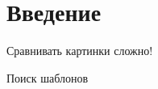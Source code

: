 \section{Введение}

\begin{frame}{Сравнивать картинки сложно!}
    
\end{frame}

\begin{frame}{Поиск шаблонов}
    
\end{frame}
